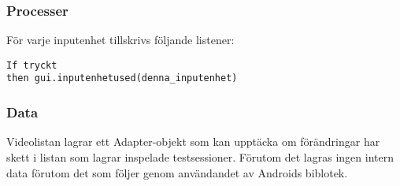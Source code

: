 \subsubsection{Processer}
För varje inputenhet tillskrivs följande listener:
\begin{verbatim}
If tryckt
then gui.inputenhetused(denna_inputenhet)
\end{verbatim}

\subsubsection{Data}
Videolistan lagrar ett Adapter-objekt som kan upptäcka om förändringar har skett i listan som lagrar inspelade testsessioner. Förutom det lagras ingen intern data förutom det som följer genom användandet av Androids biblotek.
